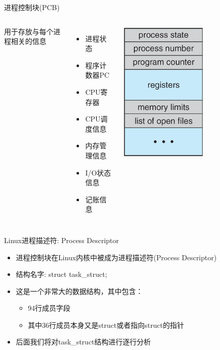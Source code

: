 \documentclass[xcolor=svgnames]{beamer}
\begin{document}
\begin{CJK*}{UTF8}{gbsn}
\begin{frame}{进程控制块(PCB)}
\begin{columns}%
用于存放与每个进程相关的信息
\begin{itemize}
\item 进程状态
\item 程序计数器PC
\item CPU寄存器
\item CPU调度信息
\item 内存管理信息
\item I/O状态信息
\item 记账信息
\end{itemize}
\includegraphics[width=0.6\textwidth]{PCB.png}
\end{columns}%
\end{frame}

\begin{frame}{Linux进程描述符: Process Descriptor}
\begin{itemize}
\item 进程控制块在Linux内核中被成为进程描述符(Process Descriptor)
\item 结构名字: struct task\_struct;
\item 这是一个非常大的数据结构，其中包含：
\begin{itemize}
\item 94行成员字段
\item 其中36行成员本身又是struct或者指向struct的指针
\end{itemize}
\item 后面我们将对task\_struct结构进行逐行分析
\end{itemize}
\end{frame}


\end{CJK*}
\end{document}
